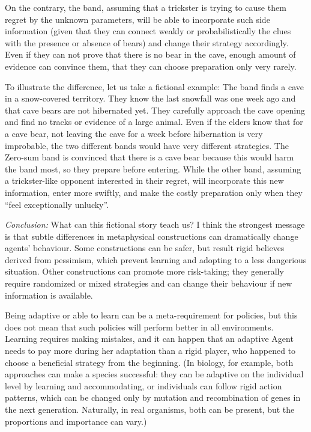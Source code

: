 \documentclass{article}
\begin{document}
On the contrary, the band, assuming that a trickster is trying to cause them regret by the unknown parameters, will be able to incorporate such side information (given that they can connect weakly or probabilistically the clues with the presence or absence of bears) and change their strategy accordingly.
Even if they can not prove that there is no bear in the cave, enough amount of evidence can convince them, that they can choose preparation only very rarely.

To illustrate the difference, let us take a fictional example:
The band finds a cave in a snow-covered territory. They know the last snowfall was one week ago and that cave bears are not hibernated yet. They carefully approach the cave opening and find no tracks or evidence of a large animal.
Even if the elders know that for a cave bear, not leaving the cave for a week before hibernation is very improbable, the two different bands would have very different strategies.
The Zero-sum band is convinced that there is a cave bear because this would harm the band most, so they prepare before entering.
While the other band, assuming a trickster-like opponent interested in their regret, will incorporate this new information, enter more swiftly, and make the costly preparation only when they ``feel exceptionally unlucky''.

{\it Conclusion:}
What can this fictional story teach us? I think the strongest message is that subtle differences in metaphysical constructions can dramatically change agents' behaviour.
Some constructions can be safer, but result rigid believes derived from pessimism, which prevent learning and adopting to a less dangerious situation.
Other constructions can promote more risk-taking; they generally require randomized or mixed strategies and can change their behaviour if new information is available.

Being adaptive or able to learn can be a meta-requirement for policies, but this does not mean that such policies will perform better in all environments.
Learning requires making mistakes, and it can happen that an adaptive Agent needs to pay more during her adaptation than a rigid player, who happened to choose a beneficial strategy from the beginning.
(In biology, for example, both approaches can make a species successful: they can be adaptive on the individual level by learning and accommodating, or individuals can follow rigid action patterns, which can be changed only by mutation and recombination of genes in the next generation. Naturally, in real organisms, both can be present, but the proportions and importance can vary.)
\end{document}

